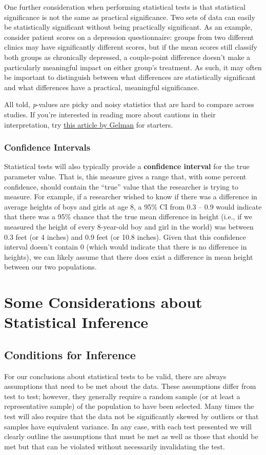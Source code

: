 One further consideration when performing statistical tests is that statistical significance is not the same as practical significance. Two sets of data can easily be statistically significant without being practically significant. As an example, consider patient scores on a depression questionnaire: groups from two different clinics may have significantly different scores, but if the mean scores still classify both groups as chronically depressed, a couple-point difference doesn't make a particularly meaningful impact on either group's treatment. As such, it may often be important to distinguish between what differences are statistically significant and what differences have a practical, meaningful significance.

All told, \textit{p}-values are picky and noisy statistics that are hard to compare across studies. If you're interested in reading more about cautions in their interpretation, try \href{http://www.stat.columbia.edu/~gelman/research/published/pvalues3.pdf}{this article by Gelman} for starters.

\subsubsection{Confidence Intervals}
Statistical tests will also typically provide a \textbf{confidence interval} for the true parameter value. That is, this measure gives a range that, with some percent confidence, should contain the ``true'' value that the researcher is trying to measure. For example, if a researcher wished to know if there was a difference in average heights of boys and girls at age 8, a 95\% CI from 0.3 -- 0.9 would indicate that there was a 95\% chance that the true mean difference in height (i.e., if we measured the height of every 8-year-old boy and girl in the world) was between 0.3 feet (or 4 inches) and 0.9 feet (or 10.8 inches). Given that this confidence interval doesn't contain 0 (which would indicate that there is no difference in heights), we can likely assume that there does exist a difference in mean height between our two populations.

\section{Some Considerations about Statistical Inference}

\subsection{Conditions for Inference}
For our conclusions about statistical tests to be valid, there are always assumptions that need to be met about the data. These assumptions differ from test to test; however, they generally require a random sample (or at least a representative sample) of the population to have been selected. Many times the test will also require that the data not be significantly skewed by outliers or that samples have equivalent variance. In any case, with each test presented we will clearly outline the assumptions that must be met as well as those that should be met but that can be violated without necessarily invalidating the test.

